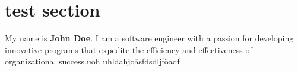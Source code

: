 \section{test section}
My name is \textbf{John Doe}. I am a software engineer with a passion for developing innovative programs that expedite the efficiency and effectiveness of organizational success.uoh
uhldahjoåsfdsdljföadf